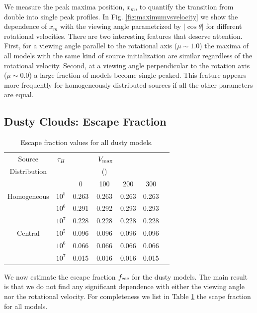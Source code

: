 \documentclass{emulateapj}
\newcommand{\kms}{{\ifmmode{{\mathrm{\,km\ s}^{-1}}}\else{\,km~s$^{-1}$}\fi}}
\begin{document}
We measure the peak maxima position, $x_m$, to quantify the transition from
double into single peak profiles. 
In Fig. \ref{fig:maximumvsvelocity} we show the dependence of $x_m$ with
the viewing angle parametrized by $|\cos\theta|$ for different
rotational velocities.
There are two interesting features that deserve attention. 
First, for a viewing angle parallel to the rotational axis ($\mu\sim
1.0$) the maxima of all models with the same kind of source
initialization are similar regardless of the rotational velocity.  
Second, at a viewing angle perpendicular to the rotation axis ($\mu\sim 0.0$) a
large fraction of models become single peaked. 
This feature appears more frequently for homogeneously distributed
sources if all the other parameters are equal. 

\subsection{Dusty Clouds: Escape Fraction}
\label{sec:escapefraction}

\begin{table}
\begin{center}
\begin{tabular}{c cccccc}
\hline \hline
Source & $\tau_{H}$ & &  $\ V_{\rm max}$& & \\
Distribution& &    & (\kms) & & \\ 
& & 0 & 100 &200 & 300\\ \hline 
Homogeneous & $10^{5}$& 0.263 &  0.263 &  0.263 &  0.263  \\
            & $10^{6}$ & 0.291 &   0.292 &  0.293 &  0.293 \\
            &$10^{7}$ &  0.228 &  0.228 &  0.228 &  0.228 \\
Central & $10^{5}$ &  0.096 & 0.096 &  0.096 & 0.096 \\
  		&$10^{6}$ & 0.066 &  0.066 &  0.066 &  0.066 \\
 		&$10^{7}$ & 0.015 & 0.016 & 0.016 & 0.015 \\
\hline
\end{tabular}
\caption{
 Escape fraction values for all dusty models. } 
\label{table:escape}
\end{center}
\end{table}

We now estimate the escape fraction $f_{\rm esc}$ for the dusty
models. 
The main  result is that we do not find any significant dependence
with either the viewing angle nor the rotational velocity.  
For completeness we list in Table \ref{table:escape} the scape
fraction for all models.
\end{document}
